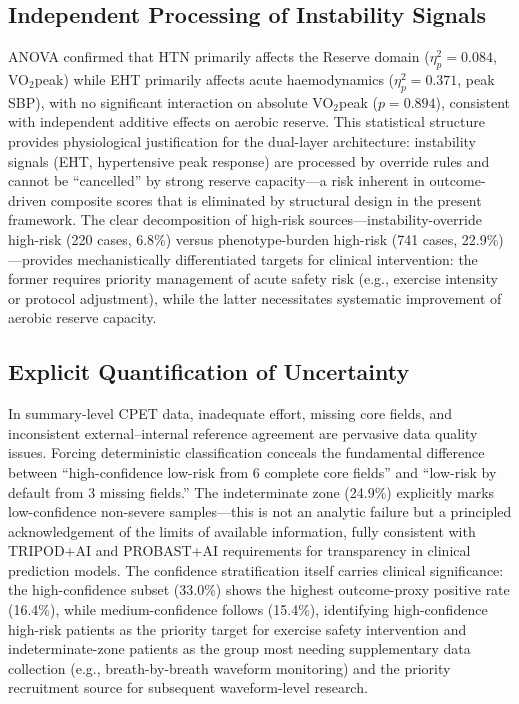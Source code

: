 \documentclass[12pt, a4paper]{article}
\begin{document}
\subsection{Independent Processing of Instability Signals}

ANOVA confirmed that HTN primarily affects the Reserve domain
($\eta^2_p = 0.084$, VO$_2$peak) while EHT primarily affects acute haemodynamics
($\eta^2_p = 0.371$, peak SBP), with no significant interaction on absolute VO$_2$peak
($p = 0.894$), consistent with independent additive effects on aerobic reserve. This
statistical structure provides physiological justification for
the dual-layer architecture: instability signals (EHT, hypertensive peak response)
are processed by override rules and cannot be ``cancelled'' by strong reserve
capacity---a risk inherent in outcome-driven composite scores that is eliminated
by structural design in the present framework.
The clear decomposition of high-risk sources---instability-override high-risk
(220 cases, 6.8\%) versus phenotype-burden high-risk (741 cases, 22.9\%)---provides
mechanistically differentiated targets for clinical intervention: the former
requires priority management of acute safety risk (e.g., exercise intensity or
protocol adjustment), while the latter necessitates systematic improvement of
aerobic reserve capacity.

\subsection{Explicit Quantification of Uncertainty}

In summary-level CPET data, inadequate effort, missing core fields, and
inconsistent external--internal reference agreement are pervasive data quality
issues. Forcing deterministic classification conceals the fundamental difference
between ``high-confidence low-risk from 6 complete core fields'' and ``low-risk
by default from 3 missing fields.'' The indeterminate zone (24.9\%) explicitly
marks low-confidence non-severe samples---this is not an analytic failure but a
principled acknowledgement of the limits of available information, fully
consistent with TRIPOD+AI\cite{TRIPODAI2024} and PROBAST+AI\cite{PROBASTAI2025}
requirements for transparency in clinical prediction models.
The confidence stratification itself carries clinical significance: the
high-confidence subset (33.0\%) shows the highest outcome-proxy positive rate
(16.4\%), while medium-confidence follows (15.4\%), identifying high-confidence
high-risk patients as the priority target for exercise safety intervention and
indeterminate-zone patients as the group most needing supplementary data
collection (e.g., breath-by-breath waveform monitoring) and the priority
recruitment source for subsequent waveform-level research.
\end{document}
